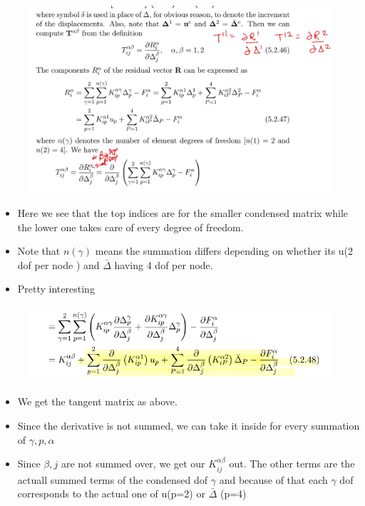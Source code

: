 	\begin{frame}
		\begin{figure}
			\centering
			\includegraphics[width=0.8\linewidth]{Figure/2}
			\label{fig:2}
		\end{figure}
		\begin{itemize}
			\item Here we see that the top indices are for the smaller condensed matrix while the lower one takes care of every degree of freedom. 
			\item Note that $n(\gamma)$ means the summation differs depending on whether its u(2 dof per node ) and $\bar{\Delta}$ having 4 dof per node. 
			\item Pretty interesting
		\end{itemize}
	\end{frame}


	\begin{frame}
		\begin{figure}
			\centering
			\includegraphics[width=0.8\linewidth]{Figure/3}
			\label{fig:3}
		\end{figure}
		\begin{itemize}
			\item We get the tangent matrix as above. 
			\item Since the derivative is not summed, we can take it inside for every summation of $\gamma, p, \alpha$ 
			\item Since $\beta, j$ are not summed over, we get our $K^{\alpha \beta}_{ij}$ out. The other terms are the actuall summed terms of the condensed dof $\gamma$ and because of that each $\gamma$ dof corresponds to the actual one of u(p=2) or $\bar{\Delta }$ (p=4)

			
		\end{itemize}
	\end{frame}


